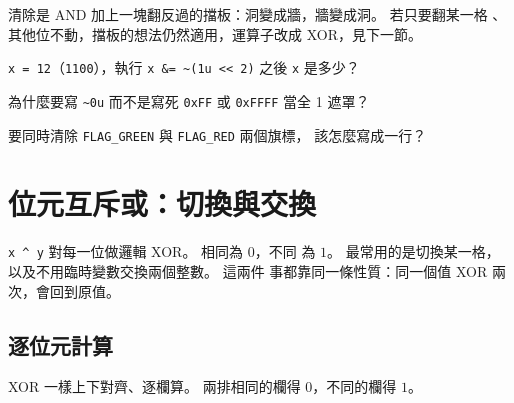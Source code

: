 清除是 AND 加上一塊翻反過的擋板：洞變成牆，牆變成洞。 若只要翻某一格
、其他位不動，擋板的想法仍然適用，運算子改成 XOR，見下一節。


\begin{drills}[label=drills:bit-complement]
\item \texttt{x = 12}（\texttt{1100}），執行 \texttt{x \&= \~{}(1u <<
2)} 之後 \texttt{x} 是多少？
\item 為什麼要寫 \texttt{\~{}0u} 而不是寫死 \texttt{0xFF} 或
\texttt{0xFFFF} 當全 1 遮罩？
\item 要同時清除 \texttt{FLAG\_GREEN} 與 \texttt{FLAG\_RED} 兩個旗標，
該怎麼寫成一行？
\end{drills}

\section{位元互斥或：切換與交換}
\label{sec:bit-xor}

\texttt{x \textasciicircum{} y} 對每一位做邏輯 XOR。 相同為 $0$，不同
為 $1$。 最常用的是切換某一格，以及不用臨時變數交換兩個整數。 這兩件
事都靠同一條性質：同一個值 XOR 兩次，會回到原值。

\subsection[逐位元計算：XOR]{逐位元計算}

XOR 一樣上下對齊、逐欄算。 兩排相同的欄得 $0$，不同的欄得 $1$。

